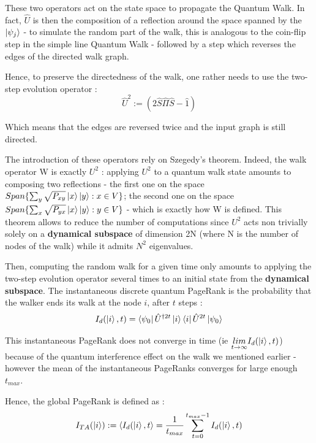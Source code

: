 \documentclass{article}
\begin{document}
These two operators act on the state space to propagate the Quantum Walk. In fact, $\hat{U}$ is then the composition of a reflection around the space spanned by the $\ket{\psi_j}$ - to simulate the random part of the walk, this is analogous to the coin-flip step in the simple line Quantum Walk - followed by a step which reverses the edges of the directed walk graph.

Hence, to preserve the directedness of the walk, one rather needs to use the two-step evolution operator : 
\begin{equation*}
    \hat{U}^2 := (2 \hat{S} \hat{\Pi} \hat{S} - \hat{1})
\end{equation*}

Which means that the edges are reversed twice and the input graph is still directed.

The introduction of these operators rely on Szegedy's theorem. Indeed, the walk operator W is exactly $U^2$ : applying $U^2$ to a quantum walk state amounts to composing two reflections - the first one on the space $Span\{\sum_y \sqrt{P_{xy}} \ket{x} \ket{y} : x \in V\}$; the second one on the space $Span\{\sum_x \sqrt{P_{yx}} \ket{x} \ket{y} : y \in V\}$ - which is exactly how W is defined. This theorem allows to reduce the number of computations since $U^2$ acts non trivially solely on a \textbf{dynamical subspace} of dimension 2N (where N is the number of nodes of the walk) while it admits $N^2$ eigenvalues.

Then, computing the random walk for a given time only amounts to applying the two-step evolution operator several times to an initial state from the \textbf{dynamical subspace}. The instantaneous discrete quantum PageRank is the probability that the walker ends its walk at the node $i$, after $t$ steps :
\begin{equation*}
    I_d(\ket{i}, t) = \bra{\psi_0} \hat{U}^{\dagger 2t} \ket{i} \bra{i} \hat{U}^{2t} \ket{\psi_0}
\end{equation*}

This instantaneous PageRank does not converge in time (ie $\underset{t\rightarrow\infty}{lim} I_d(\ket{i}, t)$) because of the quantum interference effect on the walk we mentioned earlier - however the mean of the instantaneous PageRanks converges for large enough $t_{max}$.

Hence, the global PageRank is defined as : 
\begin{equation*}
    I_{TA}(\ket{i}) := \braket{I_d(\ket{i}, t}= \frac{1}{t_{max}} \sum_{t=0}^{t_{max}-1} I_d(\ket{i}, t)
\end{equation*}
\end{document}
